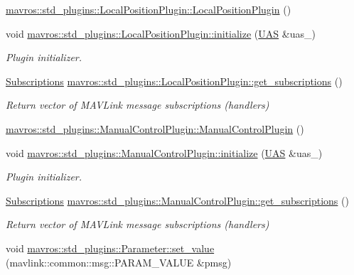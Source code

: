 \begin{DoxyCompactItemize}
\mbox{\hyperlink{group__plugin_gad2a26e43b5b4e92c9a25e65b42e7fcf9}{mavros\+::std\+\_\+plugins\+::\+Local\+Position\+Plugin\+::\+Local\+Position\+Plugin}} ()
\item 
void \mbox{\hyperlink{group__plugin_gaade9f826008c705ea3cd120c7154e26c}{mavros\+::std\+\_\+plugins\+::\+Local\+Position\+Plugin\+::initialize}} (\mbox{\hyperlink{classmavros_1_1UAS}{U\+AS}} \&uas\+\_\+)
\begin{DoxyCompactList}\small\item\em Plugin initializer. \end{DoxyCompactList}\item 
\mbox{\hyperlink{group__plugin_ga8967d61fc77040e0c3ea5a4585d62a09}{Subscriptions}} \mbox{\hyperlink{group__plugin_ga45d714bacb570023793b00c91a7695af}{mavros\+::std\+\_\+plugins\+::\+Local\+Position\+Plugin\+::get\+\_\+subscriptions}} ()
\begin{DoxyCompactList}\small\item\em Return vector of M\+A\+V\+Link message subscriptions (handlers) \end{DoxyCompactList}\item 
\mbox{\hyperlink{group__plugin_ga8e2654a3b76c1f377d99fd21817d8e3c}{mavros\+::std\+\_\+plugins\+::\+Manual\+Control\+Plugin\+::\+Manual\+Control\+Plugin}} ()
\item 
void \mbox{\hyperlink{group__plugin_ga20c1a742c3270e32e681f08f79199451}{mavros\+::std\+\_\+plugins\+::\+Manual\+Control\+Plugin\+::initialize}} (\mbox{\hyperlink{classmavros_1_1UAS}{U\+AS}} \&uas\+\_\+)
\begin{DoxyCompactList}\small\item\em Plugin initializer. \end{DoxyCompactList}\item 
\mbox{\hyperlink{group__plugin_ga8967d61fc77040e0c3ea5a4585d62a09}{Subscriptions}} \mbox{\hyperlink{group__plugin_ga2cd6218d2064c57672b01df2900c3de2}{mavros\+::std\+\_\+plugins\+::\+Manual\+Control\+Plugin\+::get\+\_\+subscriptions}} ()
\begin{DoxyCompactList}\small\item\em Return vector of M\+A\+V\+Link message subscriptions (handlers) \end{DoxyCompactList}\item 
void \mbox{\hyperlink{group__plugin_gaacaefc75948fab6cb140c8fbe6a9398e}{mavros\+::std\+\_\+plugins\+::\+Parameter\+::set\+\_\+value}} (mavlink\+::common\+::msg\+::\+P\+A\+R\+A\+M\+\_\+\+V\+A\+L\+UE \&pmsg)
\item 

\end{DoxyCompactItemize}

